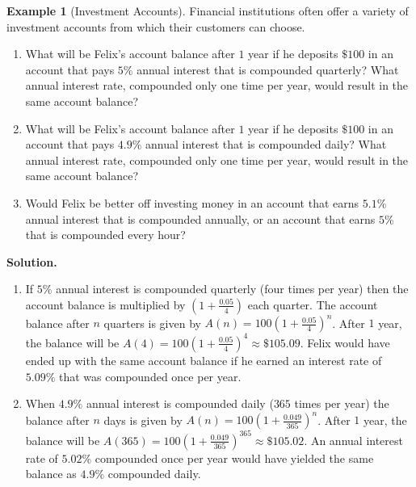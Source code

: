 \documentclass[10pt,]{book}
\theoremstyle{plain}
\theoremstyle{definition}
\theoremstyle{definition}
\newtheorem{example}[theorem]{Example}
\theoremstyle{definition}
\numberwithin{equation}{section}
\begin{document}
\begin{example}[Investment Accounts]\label{chapter04-section05-investment-accounts}
\hypertarget{p-204}{}%
Financial institutions often offer a variety of investment accounts from which their customers can choose.%
\leavevmode%
\begin{enumerate}
\item\hypertarget{li-98}{}What will be Felix’s account balance after \(1\) year if he deposits \(\$100\) in an account that pays \(5\%\) annual interest that is compounded quarterly? What annual interest rate, compounded only one time per year, would result in the same account balance?%
\item\hypertarget{li-99}{}What will be Felix’s account balance after \(1\) year if he deposits \(\$100\) in an account that pays \(4.9\%\) annual interest that is compounded daily? What annual interest rate, compounded only one time per year, would result in the same account balance?%
\item\hypertarget{li-100}{}Would Felix be better off investing money in an account that earns \(5.1\%\) annual interest that is compounded annually, or an account that earns \(5\%\) that is compounded every hour?%
\end{enumerate}
\par\smallskip%
\noindent\textbf{Solution.}\hypertarget{solution-13}{}\quad%
\leavevmode%
\begin{enumerate}
\item\hypertarget{li-101}{}If \(5\%\) annual interest is compounded quarterly (four times per year) then the account balance is multiplied by \((1+\frac{0.05}{4})\) each quarter. The account balance after \(n\) quarters is given by \(A(n)=100(1+\frac{0.05}{4})^n\). After \(1\) year, the balance will be \(A(4)=100(1+\frac{0.05}{4})^4 \approx \$105.09\). Felix would have ended up with the same account balance if he earned an interest rate of \(5.09\%\) that was compounded once per year.%
\item\hypertarget{li-102}{}When \(4.9\%\) annual interest is compounded daily (\(365\) times per year) the balance after \(n\) days is given by  \(A(n)=100(1+\frac{0.049}{365})^n\). After \(1\) year, the balance will be \(A(365) = 100(1+\frac{0.049}{365})^{365} \approx \$105.02\). An annual interest rate of \(5.02\%\) compounded once per year would have yielded the same balance as \(4.9\%\) compounded daily.%

\end{enumerate}
\end{example}
\end{document}
